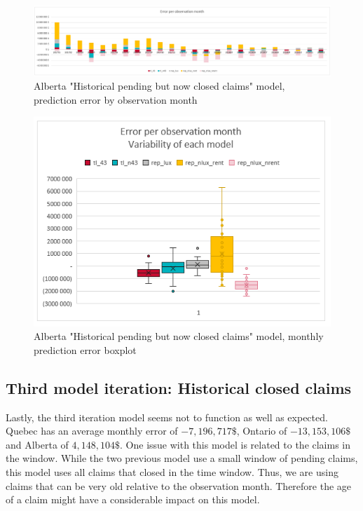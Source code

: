 		\begin{figure}[H]
			\begin{center}
				\includegraphics[scale=0.4]{Graphiques/AB_closedonly_model_by_month} 
				\renewcommand{\figurename}{Figure}
				\caption{Alberta "Historical  pending but now closed claims" model, prediction error by observation month}\label{Fig_AB_closedonly_er_by_month}
			\end{center}
		\end{figure}
		\begin{figure}[H]
			\begin{center}
				\includegraphics[scale=0.4]{Graphiques/AB_closedonly_model_mustach} 
				\renewcommand{\figurename}{Figure}
				\caption{Alberta "Historical  pending but now closed claims" model, monthly prediction error boxplot}\label{Fig_AB_closedonly_er_boxplot}
			\end{center}
		\end{figure}
	
\subsection{Third model iteration: Historical closed claims }
	Lastly, the third iteration model seems not to function as well as expected. Quebec has an average monthly error of $-7,196,717 \$ $, Ontario of $-13,153,106 \$ $ and Alberta of $4,148,104 \$ $. One issue with this model is related to the claims in the window. While the two previous model use a small window of pending claims, this model uses all claims that closed in the time window. Thus, we are using claims that can be very old relative to the observation month. Therefore the age of a claim might have a considerable impact on this model.
	
	
		 